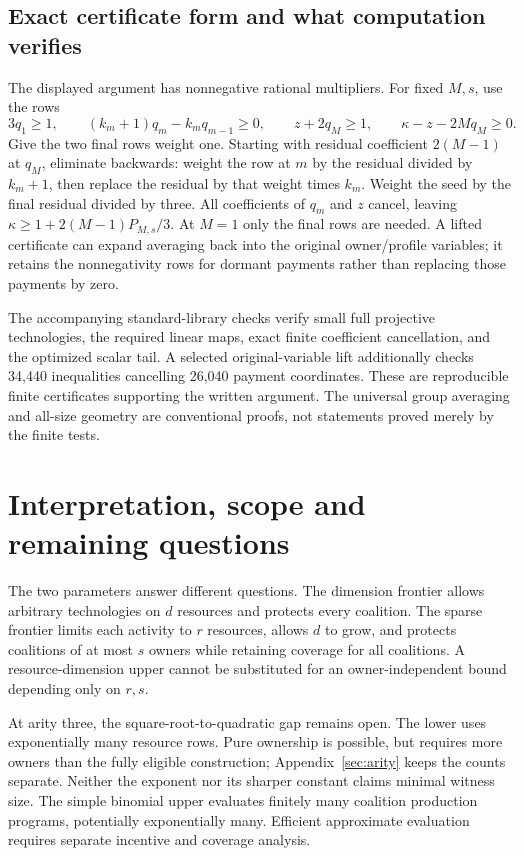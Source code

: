 \subsection{Exact certificate form and what computation verifies}
The displayed argument has nonnegative rational multipliers. For fixed $M,s$,
use the rows
\[
 3q_1\ge1,\qquad (k_m+1)q_m-k_mq_{m-1}\ge0,
 \qquad z+2q_M\ge1,\qquad \kappa-z-2M q_M\ge0.
\]
Give the two final rows weight one. Starting with residual coefficient
$2(M-1)$ at $q_M$, eliminate backwards: weight the row at $m$ by the
residual divided by $k_m+1$, then replace the residual by that weight times
$k_m$. Weight the seed by the final residual divided by three.
All coefficients of $q_m$ and $z$ cancel, leaving
$\kappa\ge1+2(M-1)P_{M,s}/3$. At $M=1$ only the final rows are needed.
A lifted certificate can expand averaging back into the original
owner/profile variables; it retains the nonnegativity rows for dormant
payments rather than replacing those payments by zero.

The accompanying standard-library checks verify small full projective
technologies, the required linear maps, exact finite coefficient cancellation,
and the optimized scalar tail. A selected original-variable lift additionally
checks 34,440 inequalities cancelling 26,040 payment coordinates. These are
reproducible finite certificates supporting the written argument. The universal
group averaging and all-size geometry are conventional proofs, not statements
proved merely by the finite tests.

\section{Interpretation, scope and remaining questions}\label{sec:discussion}
The two parameters answer different questions. The dimension frontier allows
arbitrary technologies on $d$ resources and protects every coalition. The
sparse frontier limits each activity to $r$ resources, allows $d$ to grow,
and protects coalitions of at most $s$ owners while retaining coverage for all
coalitions. A resource-dimension upper cannot be substituted for an
owner-independent bound depending only on $r,s$.

At arity three, the square-root-to-quadratic gap remains open. The lower uses
exponentially many resource rows. Pure ownership is possible, but requires
more owners than the fully eligible construction; Appendix~\ref{sec:arity}
keeps the counts separate. Neither the exponent nor its sharper constant
claims minimal witness size. The simple binomial upper evaluates finitely
many coalition production programs, potentially exponentially many. Efficient
approximate evaluation requires separate incentive and coverage analysis.

